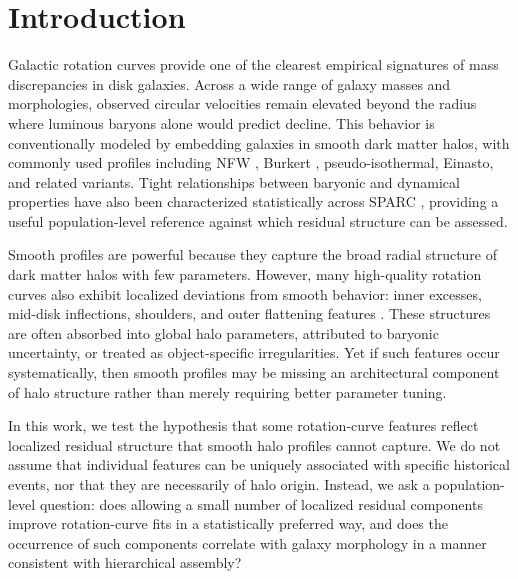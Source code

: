 
\section{Introduction}
\label{sec:intro}

Galactic rotation curves provide one of the clearest empirical signatures of mass discrepancies in disk galaxies. Across a wide range of galaxy masses and morphologies, observed circular velocities remain elevated beyond the radius where luminous baryons alone would predict decline. This behavior is conventionally modeled by embedding galaxies in smooth dark matter halos, with commonly used profiles including NFW \citep{NFW1996,NFW1997}, Burkert \citep{Burkert1995}, pseudo-isothermal, Einasto, and related variants. Tight relationships between baryonic and dynamical properties have also been characterized statistically across SPARC \citep{Lelli2016,McGaugh2016}, providing a useful population-level reference against which residual structure can be assessed.

Smooth profiles are powerful because they capture the broad radial structure of dark matter halos with few parameters. However, many high-quality rotation curves also exhibit localized deviations from smooth behavior: inner excesses, mid-disk inflections, shoulders, and outer flattening features \citep[for a review of rotation-curve diversity and core/cusp systematics, see][]{deBlok2010}. These structures are often absorbed into global halo parameters, attributed to baryonic uncertainty, or treated as object-specific irregularities. Yet if such features occur systematically, then smooth profiles may be missing an architectural component of halo structure rather than merely requiring better parameter tuning.

In this work, we test the hypothesis that some rotation-curve features reflect localized residual structure that smooth halo profiles cannot capture. We do not assume that individual features can be uniquely associated with specific historical events, nor that they are necessarily of halo origin. Instead, we ask a population-level question: does allowing a small number of localized residual components improve rotation-curve fits in a statistically preferred way, and does the occurrence of such components correlate with galaxy morphology in a manner consistent with hierarchical assembly?

